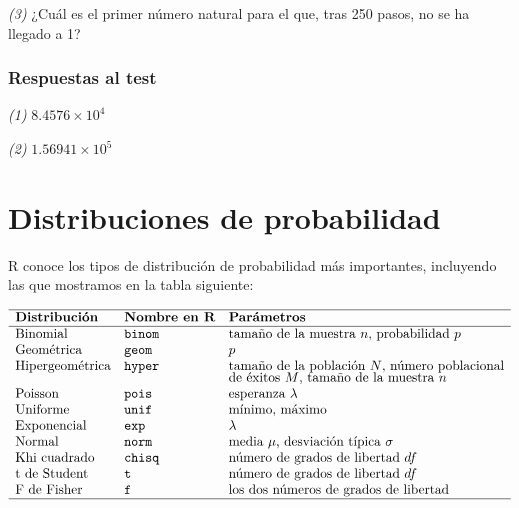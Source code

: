 \documentclass[
]{book}
\theoremstyle{definition}
\theoremstyle{definition}
\theoremstyle{definition}
\theoremstyle{remark}
\begin{document}
\emph{(3)} ¿Cuál es el primer número natural para el que, tras 250 pasos, no se ha llegado a 1?

\hypertarget{respuestas-al-test-5}{%
\subsection*{Respuestas al test}\label{respuestas-al-test-5}}

\emph{(1)} \ensuremath{8.4576\times 10^{4}}

\emph{(2)} \ensuremath{1.56941\times 10^{5}}

\hypertarget{chap:distr}{%
\chapter{Distribuciones de probabilidad}\label{chap:distr}}

R conoce los tipos de distribución de probabilidad más importantes, incluyendo las que mostramos en la tabla siguiente:

\[
\begin{array}{lll}
\hline
\textbf{Distribución} & {\textbf{Nombre en R}} & {\textbf{Parámetros}}\\ \hline
\mbox{Binomial} &{\texttt{binom}} & \mbox{tamaño de la muestra $n$, probabilidad $p$}\\
\mbox{Geométrica} & {\texttt{geom}} & \mbox{$p$}\\
\mbox{Hipergeométrica} & {\texttt{hyper}} & \mbox{tamaño de la población $N$, número poblacional}\\[-0.75ex] 
& & \mbox{de éxitos $M$, tamaño de la muestra $n$}\\
\mbox{Poisson} & {\texttt{pois}} & \mbox{esperanza $\lambda$}\\
\mbox{Uniforme} & {\texttt{unif}} & \mbox{mínimo, máximo}\\
\mbox{Exponencial} & {\texttt{exp}} & \lambda\\
\mbox{Normal} & {\texttt{norm}} & \mbox{media $\mu$, desviación típica $\sigma$}\\
\mbox{Khi cuadrado} & {\texttt{chisq}} & \mbox{número de grados de libertad $df$}\\
\mbox{t de Student} & {\texttt{t}} & \mbox{número de grados de libertad $df$}\\
\mbox{F de Fisher} & {\texttt{f}} & \mbox{los dos números de  grados de libertad}
\\ \hline
\end{array}
\]
\end{document}
